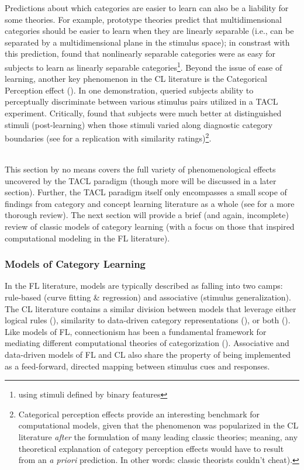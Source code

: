 \documentclass[12pt]{article}
\let\oldcite=\cite
\let\oldtextcite=\textcite
\renewcommand{\cite}[1]{\textcolor[rgb]{0, .121, .388}{\oldcite{#1}}}
\renewcommand{\textcite}[1]{\textcolor[rgb]{0, .121, .388}{\oldtextcite{#1}}}
\begin{document}
Predictions about which categories are easier to learn can also be a liability for some theories. For example, prototype theories predict that multidimensional categories should be easier to learn when they are linearly separable (i.e., can be separated by a multidimensional plane in the stimulus space); in constrast with this prediction, \textcite{medin1981linear} found that nonlinearly separable categories were as easy for subjects to learn as linearly separable categories\footnote{using stimuli defined by binary features}. Beyond the issue of ease of learning, another key phenomenon in the CL literature is the Categorical Perception effect (\cite{goldstone1994role,livingston1998categorical,pothos2014fickle}). In one demonstration, \textcite{goldstone1994role} queried subjects ability to perceptually discriminate between various stimulus pairs utilized in a TACL experiment. Critically, \textcite{goldstone1994role} found that subjects were much better at distinguished stimuli (post-learning) when those stimuli varied along diagnostic category boundaries (see \cite{goldstone2001altering} for a replication with similarity ratings)\footnote{Categorical perception effects provide an interesting benchmark for computational models, given that the phenomenon was popularized in the CL literature \emph{after} the formulation of many leading classic theories; meaning, any theoretical explanation of category perception effects would have to result from an \emph{a priori} prediction. In other words: classic theorists couldn't cheat).}.

\mbox{}\\
This section by no means covers the full variety of phenomenological effects uncovered by the TACL paradigm (though more will be discussed in a later section). Further, the TACL paradigm itself only encompasses a small scope of findings from category and concept learning literature as a whole (see \cite{murphy2004big} for a more thorough review). The next section will provide a brief (and again, incomplete) review of classic models of category learning (with a focus on those that inspired computational modeling in the FL literature).

\subsubsection{Models of Category Learning}

In the FL literature, models are typically described as falling into two camps: rule-based (curve fitting \& regression) and associative (stimulus generalization). The CL literature contains a similar division between models that leverage either logical rules (\cite{levine1975cognitive,nosofsky1994rule}), similarity to data-driven category representations (\cite{nosofsky1986attention,minda2001prototypes,love2004sustain,kurtz2007divergent}), or both (\cite{erickson1998rules}). Like models of FL, connectionism has been a fundamental framework for mediating different computational theories of categorization (\cite{gluck1988conditioning,kruschke1992alcove,kurtz2007divergent,erickson1998rules}). Associative and data-driven models of FL and CL also share the property of being implemented as a feed-forward, directed mapping between stimulus cues and responses. 
\end{document}
